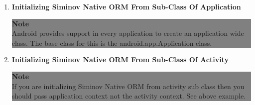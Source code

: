\begin{enumerate}

	\item \small \textbf{Initializing Siminov Native ORM From Sub-Class Of Application}

		
	
		\begin{center}
			\colorbox{grey}{
				\parbox[t]{.8\linewidth}{
					\fontsize{11pt}{11pt}\selectfont %
					\vspace*{0.1cm} %
		
					\hfill \textbf{Note} \\

					Android provides support in every application to create an application wide class. The base class for this is the android.app.Application class. 

					\vspace*{0.0cm} %
				}
			}

		\end{center}

	\item \small \textbf{Initializing Siminov Native ORM From Sub-Class Of Activity}

		


		\begin{center}
			\colorbox{grey}{
				\parbox[t]{.8\linewidth}{
					\fontsize{11pt}{11pt}\selectfont %
					\vspace*{0.1cm} %
		
					\hfill \textbf{Note} \\

					If you are initializing Siminov Native ORM from activity sub class then you should pass application context not the activity context. See above example.

					\vspace*{0.0cm} %
				}
			}

		\end{center}


\end{enumerate}



